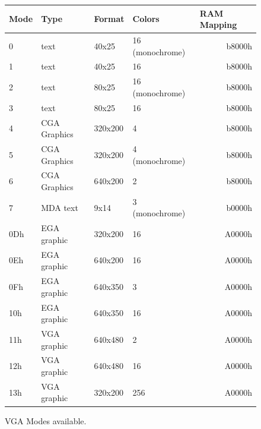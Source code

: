 \documentclass[book.tex]{subfiles}
\begin{document}
\begin{figure}[H]
\centering
\begin{table}[H]
\begin{tabularx}{\textwidth}[c]{llllr}
\hline
\textbf{Mode} & \textbf{Type} & \textbf{Format} & \textbf{Colors}          & \multicolumn{1}{l}{\textbf{RAM Mapping}} \\ \hline
0             & text          & 40x25           & 16 (monochrome) & b8000h                                \\ \hline
1             & text          & 40x25           & 16                       & b8000h                                \\ \hline
2             & text          & 80x25           & 16 (monochrome) & b8000h                                \\ \hline
3             & text          & 80x25           & 16                       & b8000h                                \\ \hline
4             & CGA Graphics  & 320x200         & 4                        & b8000h                                \\ \hline
5             & CGA Graphics  & 320x200         & 4 (monochrome)  & b8000h                                \\ \hline
6             & CGA Graphics  & 640x200         & 2                        & b8000h                                \\ \hline
7             & MDA text      & 9x14            & 3 (monochrome)  & b0000h                                \\ \hline
0Dh           & EGA graphic   & 320x200         & 16                       & A0000h                                \\ \hline
0Eh           & EGA graphic   & 640x200         & 16                       & A0000h                                \\ \hline
0Fh           & EGA graphic   & 640x350         & 3                        & A0000h                                \\ \hline
10h           & EGA graphic   & 640x350         & 16                       & A0000h                                \\ \hline
11h           & VGA graphic   & 640x480         & 2                        & A0000h                                \\ \hline
12h           & VGA graphic   & 640x480         & 16                       & A0000h                                \\ \hline
13h           & VGA graphic   & 320x200         & 256                      & A0000h                                \\ \hline
\end{tabularx}
\end{table}
\caption{VGA Modes available.}\label{fig:vga_modes}
 \end{figure}
 
\end{document}
